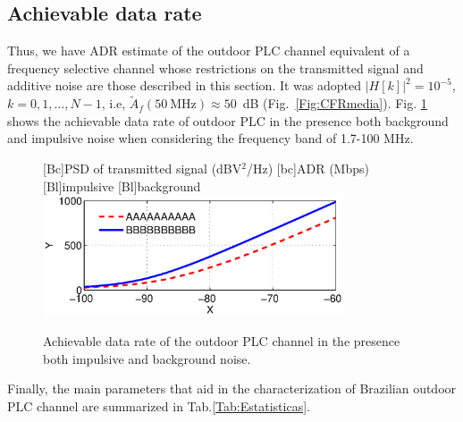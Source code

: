\documentclass[journal]{IEEEtran}
\newcommand{\tamfig}{3.5in}    %
\begin{document}
\subsection{Achievable data rate}
Thus, we have \ac{ADR} estimate of the outdoor \ac{PLC} channel equivalent of a frequency selective channel whose restrictions on the transmitted signal and additive noise are those described in this section. It was adopted $|H[k]|^2 = 10^{-5}$, $k=0,1,\ldots,N-1$, i.e, $\widetilde{A}_f(50\ \mbox{MHz}) \approx  50$~dB (Fig.~\ref{Fig:CFRmedia}). Fig. \ref{Fig:Capacidade} shows the achievable data rate of outdoor PLC in the presence both background and impulsive noise when considering the frequency band of 1.7-100 MHz.
\begin{figure}[!htp]
\begin{centering}
    [Bc]{PSD of transmitted signal (dBV$^2$/Hz)}    
    [bc]{ADR (Mbps)}
    [Bl]{impulsive}
    [Bl]{background}
    \includegraphics[width=\tamfig]{Figuras/Capacidade.eps}
    \caption{Achievable data rate of the outdoor \ac{PLC} channel in the presence both impulsive and background noise.}
    \label{Fig:Capacidade}
\end{centering}
\end{figure} 

Finally, the main parameters that aid in the characterization of Brazilian outdoor PLC channel are summarized in Tab.\ref{Tab:Estatisticas}.
\end{document}
